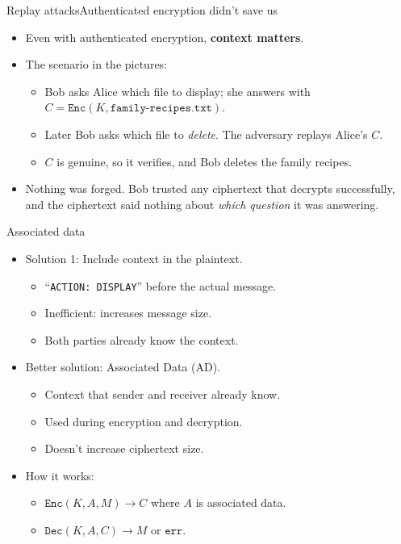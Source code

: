 \ifdefined\PRESENTATION\else\PassOptionsToClass{handout}{beamer}\fi\documentclass[aspectratio=169, lualatex]{beamer}
\begin{document}
\begin{frame}{Replay attacks}{Authenticated encryption didn't save us}
	\begin{itemize}
		\item Even with authenticated encryption, \textbf{context matters}.
		\item The scenario in the pictures:
		      \begin{itemize}
			      \item Bob asks Alice which file to display; she answers with $C = \texttt{Enc}(K, \texttt{family-recipes.txt})$.
			      \item Later Bob asks which file to \emph{delete}. The adversary replays Alice's $C$.
			      \item $C$ is genuine, so it verifies, and Bob deletes the family recipes.
		      \end{itemize}
		\item Nothing was forged. Bob trusted any ciphertext that decrypts successfully, and the ciphertext said nothing about \emph{which question} it was answering.
	\end{itemize}
\end{frame}

\begin{frame}{Associated data}
	\begin{itemize}
		\item Solution 1: Include context in the plaintext.
		      \begin{itemize}
			      \item ``\texttt{ACTION: DISPLAY}'' before the actual message.
			      \item Inefficient: increases message size.
			      \item Both parties already know the context.
		      \end{itemize}
		\item Better solution: Associated Data (AD).
		      \begin{itemize}
			      \item Context that sender and receiver already know.
			      \item Used during encryption and decryption.
			      \item Doesn't increase ciphertext size.
		      \end{itemize}
		\item How it works:
		      \begin{itemize}
			      \item $\texttt{Enc}(K, A, M) \rightarrow C$ where $A$ is associated data.
			      \item $\texttt{Dec}(K, A, C) \rightarrow M$ or $\texttt{err}$.
		      \end{itemize}
	\end{itemize}
\end{frame}
\end{document}
